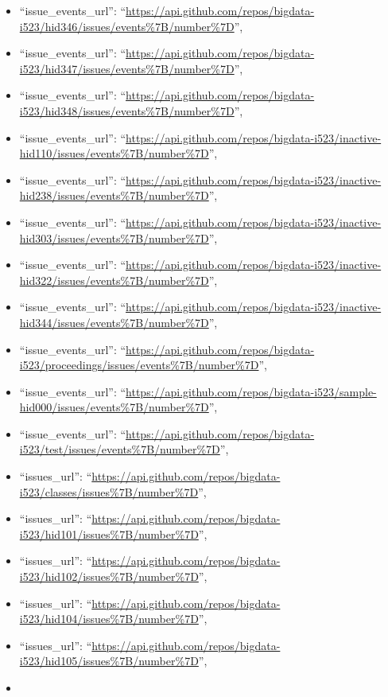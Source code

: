 \begin{itemize}
\item
  ``issue\_events\_url'':
  ``\url{https://api.github.com/repos/bigdata-i523/hid346/issues/events\%7B/number\%7D}'',
\item
  ``issue\_events\_url'':
  ``\url{https://api.github.com/repos/bigdata-i523/hid347/issues/events\%7B/number\%7D}'',
\item
  ``issue\_events\_url'':
  ``\url{https://api.github.com/repos/bigdata-i523/hid348/issues/events\%7B/number\%7D}'',
\item
  ``issue\_events\_url'':
  ``\url{https://api.github.com/repos/bigdata-i523/inactive-hid110/issues/events\%7B/number\%7D}'',
\item
  ``issue\_events\_url'':
  ``\url{https://api.github.com/repos/bigdata-i523/inactive-hid238/issues/events\%7B/number\%7D}'',
\item
  ``issue\_events\_url'':
  ``\url{https://api.github.com/repos/bigdata-i523/inactive-hid303/issues/events\%7B/number\%7D}'',
\item
  ``issue\_events\_url'':
  ``\url{https://api.github.com/repos/bigdata-i523/inactive-hid322/issues/events\%7B/number\%7D}'',
\item
  ``issue\_events\_url'':
  ``\url{https://api.github.com/repos/bigdata-i523/inactive-hid344/issues/events\%7B/number\%7D}'',
\item
  ``issue\_events\_url'':
  ``\url{https://api.github.com/repos/bigdata-i523/proceedings/issues/events\%7B/number\%7D}'',
\item
  ``issue\_events\_url'':
  ``\url{https://api.github.com/repos/bigdata-i523/sample-hid000/issues/events\%7B/number\%7D}'',
\item
  ``issue\_events\_url'':
  ``\url{https://api.github.com/repos/bigdata-i523/test/issues/events\%7B/number\%7D}'',
\item
  ``issues\_url'':
  ``\url{https://api.github.com/repos/bigdata-i523/classes/issues\%7B/number\%7D}'',
\item
  ``issues\_url'':
  ``\url{https://api.github.com/repos/bigdata-i523/hid101/issues\%7B/number\%7D}'',
\item
  ``issues\_url'':
  ``\url{https://api.github.com/repos/bigdata-i523/hid102/issues\%7B/number\%7D}'',
\item
  ``issues\_url'':
  ``\url{https://api.github.com/repos/bigdata-i523/hid104/issues\%7B/number\%7D}'',
\item
  ``issues\_url'':
  ``\url{https://api.github.com/repos/bigdata-i523/hid105/issues\%7B/number\%7D}'',
\item

\end{itemize}
